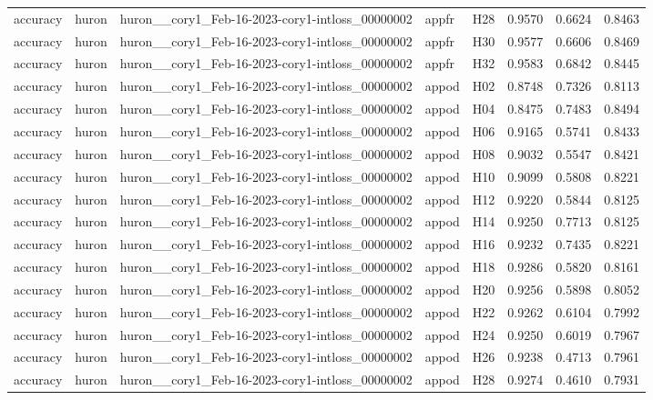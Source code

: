 \begin{table}[tbp]
\begin{tabular}{lllllrrr}
accuracy & huron & huron\_\_cory1\_Feb-16-2023-cory1-intloss\_00000002 & appfr & H28 & 0.9570 & 0.6624 & 0.8463 \\
accuracy & huron & huron\_\_cory1\_Feb-16-2023-cory1-intloss\_00000002 & appfr & H30 & 0.9577 & 0.6606 & 0.8469 \\
accuracy & huron & huron\_\_cory1\_Feb-16-2023-cory1-intloss\_00000002 & appfr & H32 & 0.9583 & 0.6842 & 0.8445 \\
accuracy & huron & huron\_\_cory1\_Feb-16-2023-cory1-intloss\_00000002 & appod & H02 & 0.8748 & 0.7326 & 0.8113 \\
accuracy & huron & huron\_\_cory1\_Feb-16-2023-cory1-intloss\_00000002 & appod & H04 & 0.8475 & 0.7483 & 0.8494 \\
accuracy & huron & huron\_\_cory1\_Feb-16-2023-cory1-intloss\_00000002 & appod & H06 & 0.9165 & 0.5741 & 0.8433 \\
accuracy & huron & huron\_\_cory1\_Feb-16-2023-cory1-intloss\_00000002 & appod & H08 & 0.9032 & 0.5547 & 0.8421 \\
accuracy & huron & huron\_\_cory1\_Feb-16-2023-cory1-intloss\_00000002 & appod & H10 & 0.9099 & 0.5808 & 0.8221 \\
accuracy & huron & huron\_\_cory1\_Feb-16-2023-cory1-intloss\_00000002 & appod & H12 & 0.9220 & 0.5844 & 0.8125 \\
accuracy & huron & huron\_\_cory1\_Feb-16-2023-cory1-intloss\_00000002 & appod & H14 & 0.9250 & 0.7713 & 0.8125 \\
accuracy & huron & huron\_\_cory1\_Feb-16-2023-cory1-intloss\_00000002 & appod & H16 & 0.9232 & 0.7435 & 0.8221 \\
accuracy & huron & huron\_\_cory1\_Feb-16-2023-cory1-intloss\_00000002 & appod & H18 & 0.9286 & 0.5820 & 0.8161 \\
accuracy & huron & huron\_\_cory1\_Feb-16-2023-cory1-intloss\_00000002 & appod & H20 & 0.9256 & 0.5898 & 0.8052 \\
accuracy & huron & huron\_\_cory1\_Feb-16-2023-cory1-intloss\_00000002 & appod & H22 & 0.9262 & 0.6104 & 0.7992 \\
accuracy & huron & huron\_\_cory1\_Feb-16-2023-cory1-intloss\_00000002 & appod & H24 & 0.9250 & 0.6019 & 0.7967 \\
accuracy & huron & huron\_\_cory1\_Feb-16-2023-cory1-intloss\_00000002 & appod & H26 & 0.9238 & 0.4713 & 0.7961 \\
accuracy & huron & huron\_\_cory1\_Feb-16-2023-cory1-intloss\_00000002 & appod & H28 & 0.9274 & 0.4610 & 0.7931 \\

\end{tabular}
\end{table}
